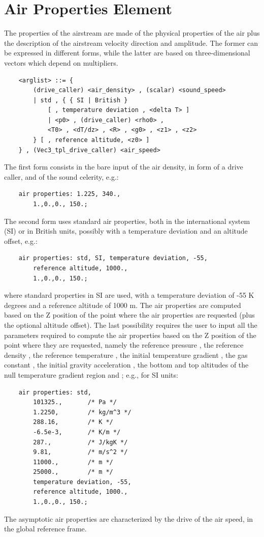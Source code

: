 \section{Air Properties Element}
The properties of the airstream are made of the physical properties
of the air plus the description of the airstream velocity direction
and amplitude.
The former can be expressed in different forms, while the latter
are based on three-dimensional vectors which depend on multipliers.
\begin{verbatim}
    <arglist> ::= {
        (drive_caller) <air_density> , (scalar) <sound_speed> 
        | std , { { SI | British }
            [ , temperature deviation , <delta T> ]
            | <p0> , (drive_caller) <rho0> ,
            <T0> , <dT/dz> , <R> , <g0> , <z1> , <z2>
        } [ , reference altitude, <z0> ]
    } , (Vec3_tpl_drive_caller) <air_speed>
\end{verbatim}
The first form consists in the bare input of the air density,
in form of a drive caller, and of the sound celerity, e.g.:
\begin{verbatim}
    air properties: 1.225, 340.,
        1.,0.,0., 150.;
\end{verbatim}
The second form uses standard air properties, both in the
international system (SI) or in British units, possibly
with a temperature deviation and an altitude offset, e.g.:
\begin{verbatim}
    air properties: std, SI, temperature deviation, -55,
        reference altitude, 1000.,
        1.,0.,0., 150.;
\end{verbatim}
where standard properties in SI are used, with a temperature
deviation of -55 K degrees and a reference altitude of 1000 m.
The air properties are computed based on the Z position of the
point where the air properties are requested (plus the optional
altitude offset).
The last possibility requires the user to input all the parameters
required to compute the air properties based on the Z position
of the point where they are requested, namely the reference
pressure , the reference density ,
the reference temperature , the initial temperature
gradient , the gas constant , the
initial gravity acceleration , the bottom and top
altitudes of the null temperature gradient region  and
; e.g., for SI units:
\begin{verbatim}
    air properties: std,
        101325.,       /* Pa */
        1.2250,        /* kg/m^3 */
        288.16,        /* K */
        -6.5e-3,       /* K/m */
        287.,          /* J/kgK */
        9.81,          /* m/s^2 */
        11000.,        /* m */
        25000.,        /* m */
        temperature deviation, -55,
        reference altitude, 1000.,
        1.,0.,0., 150.;
\end{verbatim}
The asymptotic air properties are characterized by the drive of the 
air speed, in the global reference frame.





